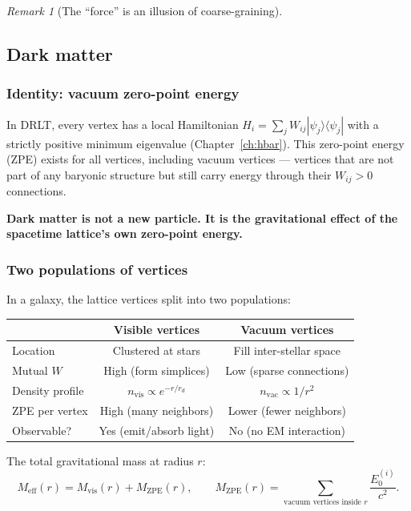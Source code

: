 \documentclass[12pt]{article}
\theoremstyle{remark}
\newtheorem{remark}[theorem]{Remark}
\theoremstyle{definition}
\begin{document}
\begin{remark}[The ``force'' is an illusion of coarse-graining]
\subsection{Dark matter}

\subsubsection{Identity: vacuum zero-point energy}

In DRLT, every vertex has a local Hamiltonian $H_i = \sum_j W_{ij}|\psi_j\rangle\langle\psi_j|$ with a strictly positive minimum eigenvalue (Chapter~\ref{ch:hbar}). This zero-point energy (ZPE) exists for all vertices, including vacuum vertices --- vertices that are not part of any baryonic structure but still carry energy through their $W_{ij} > 0$ connections.

\textbf{Dark matter is not a new particle. It is the gravitational effect of the spacetime lattice's own zero-point energy.}

\subsubsection{Two populations of vertices}

In a galaxy, the lattice vertices split into two populations:

\begin{center}
\begin{tabular}{lcc}
\hline
& Visible vertices & Vacuum vertices \\
\hline
Location & Clustered at stars & Fill inter-stellar space \\
Mutual $W$ & High (form simplices) & Low (sparse connections) \\
Density profile & $n_\text{vis} \propto e^{-r/r_d}$ & $n_\text{vac} \propto 1/r^2$ \\
ZPE per vertex & High (many neighbors) & Lower (fewer neighbors) \\
Observable? & Yes (emit/absorb light) & No (no EM interaction) \\
\hline
\end{tabular}
\end{center}

The total gravitational mass at radius $r$:
\begin{equation}
M_\text{eff}(r) = M_\text{vis}(r) + M_\text{ZPE}(r), \qquad M_\text{ZPE}(r) = \sum_{\text{vacuum vertices inside } r} \frac{E_0^{(i)}}{c^2}.
\end{equation}


\end{remark}
\end{document}
